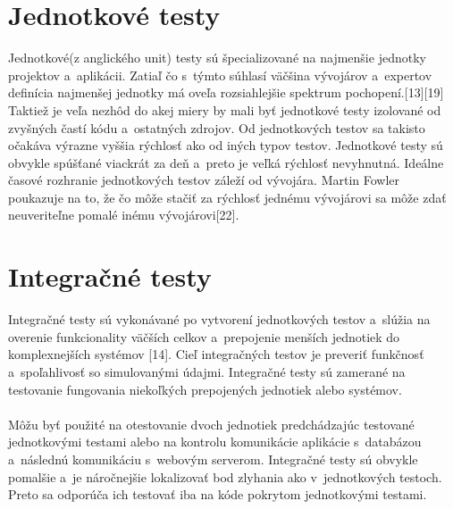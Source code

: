 \documentclass[
  digital, %
  table,   %
oneside,
  nolof,     %
  nolot,     %
]{fithesis3}
\begin{document}
\section{Jednotkové testy}
Jednotkové(z anglického unit) testy sú špecializované na najmenšie jednotky projektov a~aplikácii. Zatiaľ čo s~týmto súhlasí väčšina vývojárov a~expertov definícia najmenšej jednotky má oveľa rozsiahlejšie spektrum pochopení.[13][19] Taktiež je veľa nezhôd do akej miery by mali byť jednotkové testy izolované od zvyšných častí kódu a~ostatných zdrojov. Od jednotkových testov sa takisto očakáva výrazne vyššia rýchlosť ako od iných typov testov. Jednotkové testy sú obvykle spúšťané viackrát za deň a~preto je veľká rýchlosť nevyhnutná. Ideálne časové rozhranie jednotkových testov záleží od vývojára. Martin Fowler poukazuje na to, že čo môže stačiť za rýchlosť jednému vývojárovi sa môže zdať neuveriteľne pomalé inému vývojárovi[22].
\section{Integračné testy}
Integračné testy sú vykonávané po vytvorení jednotkových testov a~slúžia na overenie funkcionality väčších celkov a~prepojenie menších jednotiek do komplexnejších systémov [14]. Cieľ integračných testov je preveriť funkčnosť a~spoľahlivosť so simulovanými údajmi. Integračné testy sú zamerané na testovanie fungovania niekoľkých prepojených jednotiek alebo systémov.\paragraph{}
Môžu byť použité na otestovanie dvoch jednotiek predchádzajúc testované jednotkovými testami alebo na kontrolu komunikácie aplikácie s~databázou a~následnú komunikáciu s~webovým serverom.  Integračné testy sú obvykle pomalšie a~je náročnejšie lokalizovať bod zlyhania ako v~jednotkových  testoch. Preto sa odporúča ich testovať iba na kóde pokrytom jednotkovými testami.
\end{document}
